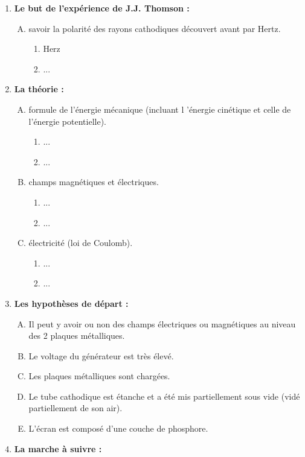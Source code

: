 \documentclass[../main.tex]{subfiles}
\begin{document}
\begin{enumerate}[I]
    \item \textbf{Le but de l'expérience de J.J. Thomson :}
    \begin{enumerate}[A.]
        \item savoir la polarité des rayons cathodiques découvert avant par Hertz.
        \begin{enumerate}[1.]
            \item Herz
            \item ...
         \end{enumerate}
    \end{enumerate}
    \item \textbf {La théorie :}
    \begin{enumerate}[A.]
        \item formule de l'énergie mécanique (incluant l 'énergie cinétique et celle de l'énergie potentielle).
            \begin{enumerate}[1.]
                \item ...
                \item ...
             \end{enumerate}
        \item champs magnétiques et électriques.
            \begin{enumerate}[1.]
                \item ...
                \item ...
             \end{enumerate}        
        \item électricité (loi de Coulomb).
            \begin{enumerate}[1.]
                \item ...
                \item ...
             \end{enumerate}
    \end{enumerate}
    \item \textbf {Les hypothèses de départ :}
    \begin{enumerate}[A.]
        \item Il peut y avoir ou non des champs électriques ou magnétiques au niveau des 2 plaques métalliques.
        \item Le voltage du générateur est très élevé.
        \item Les plaques métalliques sont chargées.
        \item Le tube cathodique est étanche et a été mis partiellement sous vide (vidé partiellement de son air).
        \item L'écran est composé d'une couche de phosphore.
    \end{enumerate}
    \item \textbf{La marche à suivre :}
    

\end{enumerate}
\end{document}
